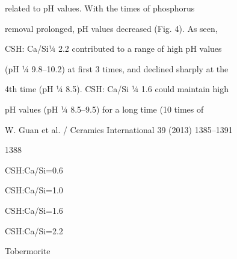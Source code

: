 \documentclass[a4paper,portrait,12pt]{article}
\begin{document}
\begin{flushleft}
related to pH values. With the times of phosphorus
\end{flushleft}


\begin{flushleft}
removal prolonged, pH values decreased (Fig. 4). As seen,
\end{flushleft}


\begin{flushleft}
CSH: Ca/Si¼ 2.2 contributed to a range of high pH values
\end{flushleft}


\begin{flushleft}
(pH ¼ 9.8--10.2) at ﬁrst 3 times, and declined sharply at the
\end{flushleft}


\begin{flushleft}
4th time (pH ¼ 8.5). CSH: Ca/Si ¼ 1.6 could maintain high
\end{flushleft}


\begin{flushleft}
pH values (pH ¼ 8.5--9.5) for a long time (10 times of
\end{flushleft}





\begin{flushleft}
\newpage
W. Guan et al. / Ceramics International 39 (2013) 1385--1391
\end{flushleft}





1388





\begin{flushleft}
CSH:Ca/Si=0.6
\end{flushleft}


\begin{flushleft}
CSH:Ca/Si=1.0
\end{flushleft}


\begin{flushleft}
CSH:Ca/Si=1.6
\end{flushleft}


\begin{flushleft}
CSH:Ca/Si=2.2
\end{flushleft}


\begin{flushleft}
Tobermorite
\end{flushleft}
\end{document}
